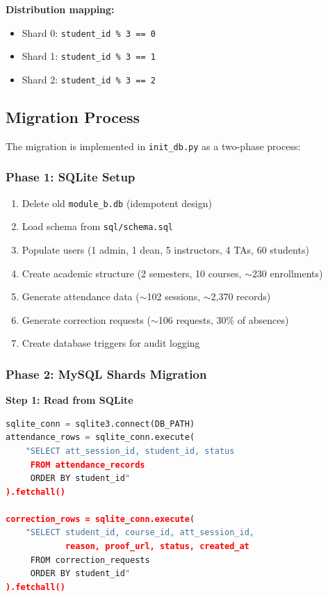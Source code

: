 \documentclass[conference]{IEEEtran}
\begin{document}
\textbf{Distribution mapping:}
\begin{itemize}
    \item Shard 0: \texttt{student\_id \% 3 == 0}
    \item Shard 1: \texttt{student\_id \% 3 == 1}
    \item Shard 2: \texttt{student\_id \% 3 == 2}
\end{itemize}

\subsection{Migration Process}

The migration is implemented in \texttt{init\_db.py} as a two-phase process:

\subsubsection{Phase 1: SQLite Setup}

\begin{enumerate}
    \item Delete old \texttt{module\_b.db} (idempotent design)
    \item Load schema from \texttt{sql/schema.sql}
    \item Populate users (1 admin, 1 dean, 5 instructors, 4 TAs, 60 students)
    \item Create academic structure (2 semesters, 10 courses, $\sim$230 enrollments)
    \item Generate attendance data ($\sim$102 sessions, $\sim$2,370 records)
    \item Generate correction requests ($\sim$106 requests, 30\% of absences)
    \item Create database triggers for audit logging
\end{enumerate}

\subsubsection{Phase 2: MySQL Shards Migration}

\textbf{Step 1: Read from SQLite}
\begin{lstlisting}[language=Python]
sqlite_conn = sqlite3.connect(DB_PATH)
attendance_rows = sqlite_conn.execute(
    "SELECT att_session_id, student_id, status 
     FROM attendance_records 
     ORDER BY student_id"
).fetchall()

correction_rows = sqlite_conn.execute(
    "SELECT student_id, course_id, att_session_id, 
            reason, proof_url, status, created_at 
     FROM correction_requests 
     ORDER BY student_id"
).fetchall()
\end{lstlisting}
\end{document}

